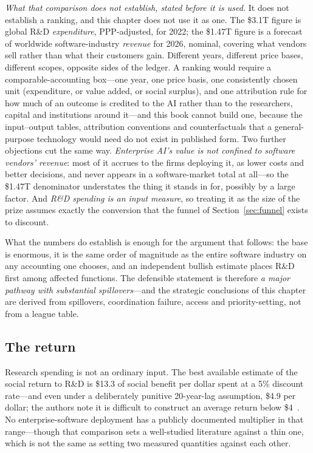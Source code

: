 \emph{What that comparison does not establish, stated before it is used.} It does not establish a ranking, and this chapter does not use it as one. The \$3.1T figure is global R\&D \emph{expenditure}, PPP-adjusted, for 2022; the \$1.47T figure is a forecast of worldwide software-industry \emph{revenue} for 2026, nominal, covering what vendors sell rather than what their customers gain. Different years, different price bases, different scopes, opposite sides of the ledger. A ranking would require a comparable-accounting box---one year, one price basis, one consistently chosen unit (expenditure, or value added, or social surplus), and one attribution rule for how much of an outcome is credited to the AI rather than to the researchers, capital and institutions around it---and this book cannot build one, because the input--output tables, attribution conventions and counterfactuals that a general-purpose technology would need do not exist in published form. Two further objections cut the same way. \emph{Enterprise AI's value is not confined to software vendors' revenue}: most of it accrues to the firms deploying it, as lower costs and better decisions, and never appears in a software-market total at all---so the \$1.47T denominator understates the thing it stands in for, possibly by a large factor. And \emph{R\&D spending is an input measure}, so treating it as the size of the prize assumes exactly the conversion that the funnel of Section~\ref{sec:funnel} exists to discount.

What the numbers do establish is enough for the argument that follows: the base is enormous, it is the same order of magnitude as the entire software industry on any accounting one chooses, and an independent bullish estimate places R\&D first among affected functions. The defensible statement is therefore \emph{a major pathway with substantial spillovers}---and the strategic conclusions of this chapter are derived from spillovers, coordination failure, access and priority-setting, not from a league table.

\subsection{The return}

Research spending is not an ordinary input. The best available estimate of the social return to R\&D is \$13.3 of social benefit per dollar spent at a 5\% discount rate---and even under a deliberately punitive 20-year-lag assumption, \$4.9 per dollar; the authors note it is difficult to construct an average return below \$4~\cite{jones-summers}. No enterprise-software deployment has a publicly documented multiplier in that range---though that comparison sets a well-studied literature against a thin one, which is not the same as setting two measured quantities against each other.


